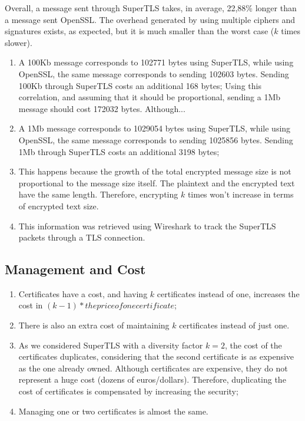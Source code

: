 \documentclass{sig-alternate-05-2015}
\begin{document}
{Overall, a message sent through SuperTLS takes, in average, 22,88\% longer than a message sent OpenSSL.
The overhead generated by using multiple ciphers and signatures exists, as expected, but it is much smaller than the worst case ($k$ times slower).

\begin{enumerate}

\item{A 100Kb message corresponds to 102771 bytes using SuperTLS, while using OpenSSL, the same message corresponds to sending 102603 bytes. Sending 100Kb through SuperTLS costs an additional 168 bytes; Using this correlation, and assuming that it should be proportional, sending a 1Mb message should cost 172032 bytes. Although...}
\item{A 1Mb message corresponds to 1029054 bytes using SuperTLS, while using OpenSSL, the same message corresponds to sending 1025856 bytes. Sending 1Mb through SuperTLS costs an additional 3198 bytes;}
\item{This happens because the growth of the total encrypted message size is not proportional to the message size itself. The plaintext and the encrypted text have the same length. Therefore, encrypting $k$ times won't increase in terms of encrypted text size.}
\item{This information was retrieved using Wireshark to track the SuperTLS packets through a TLS connection.}

\end{enumerate}

\subsection{Management and Cost}

\begin{enumerate}
\item{Certificates have a cost, and having $k$ certificates instead of one, increases the cost in $(k - 1) * the price of one certificate$;}
\item{There is also an extra cost of maintaining $k$ certificates instead of just one.}
\item{As we considered SuperTLS with a diversity factor $k = 2$, the cost of the certificates duplicates, considering that the second certificate is as expensive as the one already owned. Although certificates are expensive, they do not represent a huge cost (dozens of euros/dollars). Therefore, duplicating the cost of certificates is compensated by increasing the security;}
\item{Managing one or two certificates is almost the same.}
\end{enumerate}

}
\end{document}
